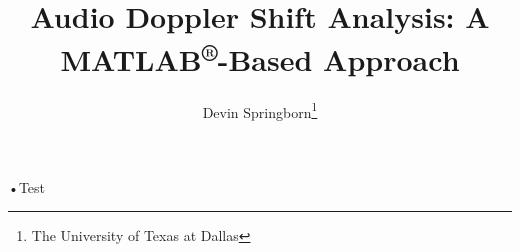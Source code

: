 \documentclass[12pt,letterpaper]{article}
\title{Audio Doppler Shift Analysis: A MATLAB\textsuperscript{®}-Based Approach}
\date{\DTMtoday}
\author{Devin Springborn\thanks{The University of Texas at Dallas}}
\begin{document}
\maketitle
%
\newpage
•Test
\end{document}

